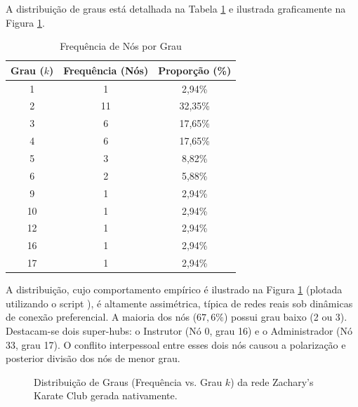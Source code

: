 \documentclass[sigconf]{webmedia}
\begin{document}
A distribuição de graus está detalhada na Tabela \ref{tab:degree_freq} e ilustrada graficamente na Figura \ref{fig:degree_dist}.

\begin{table}[h]
  \caption{Frequência de Nós por Grau}
  \label{tab:degree_freq}
  \begin{tabular}{ccc}
    \toprule
    Grau ($k$) & Frequência (Nós) & Proporção (\%) \\
    \midrule
    1 & 1 & 2,94\% \\
    2 & 11 & 32,35\% \\
    3 & 6 & 17,65\% \\
    4 & 6 & 17,65\% \\
    5 & 3 & 8,82\% \\
    6 & 2 & 5,88\% \\
    9 & 1 & 2,94\% \\
    10 & 1 & 2,94\% \\
    12 & 1 & 2,94\% \\
    16 & 1 & 2,94\% \\
    17 & 1 & 2,94\% \\
    \bottomrule
  \end{tabular}
\end{table}

A distribuição, cujo comportamento empírico é ilustrado na Figura \ref{fig:degree_dist} (plotada utilizando o script ), é altamente assimétrica, típica de redes reais sob dinâmicas de conexão preferencial. A maioria dos nós ($67,6\%$) possui grau baixo (2 ou 3). Destacam-se dois super-hubs: o Instrutor (Nó 0, grau 16) e o Administrador (Nó 33, grau 17). O conflito interpessoal entre esses dois nós causou a polarização e posterior divisão dos nós de menor grau.

\begin{figure}[h]
  \centering
  \caption{Distribuição de Graus (Frequência vs. Grau $k$) da rede Zachary's Karate Club gerada nativamente.}
  \label{fig:degree_dist}
\end{figure}
\end{document}
